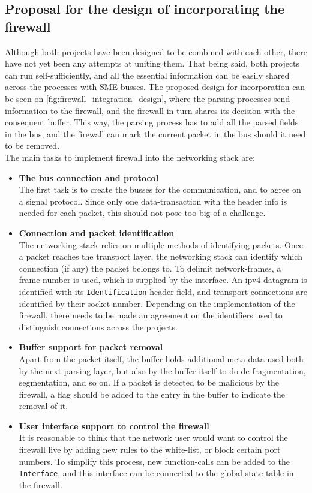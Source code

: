 \subsection{Proposal for the design of incorporating the firewall}
Although both projects have been designed to be combined with each other,
there have not yet been any attempts at uniting them.  That being said, both
projects can run self-sufficiently, and all the essential information can
be easily shared across the processes with SME busses.  The proposed design
for incorporation can be seen on \autoref{fig:firewall_integration_design},
where the parsing processes send information to the firewall, and the firewall
in turn shares its decision with the consequent buffer. This way, the parsing
process has to add all the parsed fields in the bus, and the firewall can mark
the current packet in the bus should it need to be removed.\\
The main tasks to implement firewall into the networking stack are:
\begin{itemize}
\item \textbf{The bus connection and protocol}\\
The first task is to create the busses for the communication, and to agree on
a signal protocol. Since only one data-transaction with the header info is
needed for each packet, this should not pose too big of a challenge.

\item \textbf{Connection and packet identification}\\
The networking stack relies on multiple methods of identifying packets.
Once a packet reaches the transport layer, the networking stack can identify
which connection (if any) the packet belongs to. To delimit network-frames, a
frame-number is used, which is supplied by the interface. An \gls{ipv4}
datagram is identified with its \texttt{Identification} header field, and
transport connections are identified by their socket number.
Depending on the implementation of the firewall, there needs to be made an
agreement on the identifiers used to distinguish connections across the
projects.

\item \textbf{Buffer support for packet removal}\\
Apart from the packet itself, the buffer holds additional meta-data used both
by the next parsing layer, but also by the buffer itself to do
de-fragmentation, segmentation, and so on. If a packet is detected to be
malicious by the firewall, a flag should be added to the entry in the buffer to
indicate the removal of it.

\item \textbf{User interface support to control the firewall}\\
It is reasonable to think that the network user would want to control the
firewall live by adding new rules to the white-list, or block certain port
numbers. To simplify this process, new function-calls can be added to the
\texttt{Interface}, and this interface can be connected to the global
state-table in the firewall.
\end{itemize}



